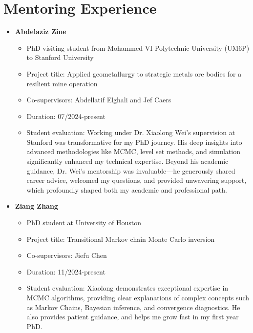 \documentclass[11pt, a4paper]{article}
\begin{document}
\section*{Mentoring Experience}
\begin{itemize}
	\item{\textbf{Abdelaziz Zine}}
	\begin{itemize}
	\item PhD visiting student from Mohammed VI Polytechnic University (UM6P) to Stanford University
	\item Project title: Applied geometallurgy to strategic metals ore bodies for a resilient mine operation
	\item Co-supervisors: Abdellatif Elghali and Jef Caers
	\item Duration: 07/2024-present
	\item Student evaluation: Working under Dr. Xiaolong Wei's supervision at Stanford was transformative for my PhD journey. His deep insights into advanced methodologies like MCMC, level set methods, and simulation significantly enhanced my technical expertise. Beyond his academic guidance, Dr. Wei’s mentorship was invaluable—he generously shared career advice, welcomed my questions, and provided unwavering support, which profoundly shaped both my academic and professional path.
	\end{itemize}
	
	\item{\textbf{Ziang Zhang}}
	\begin{itemize}
	\item PhD student at University of Houston
	\item Project title: Transitional Markov chain Monte Carlo inversion
	\item Co-supervisors: Jiefu Chen
	\item Duration: 11/2024-present
	\item Student evaluation: Xiaolong demonstrates exceptional expertise in MCMC algorithms, providing clear explanations of complex concepts such as Markov Chains, Bayesian inference, and convergence diagnostics. He also provides patient guidance, and helps me grow fast in my first year PhD.
	\end{itemize}

\end{itemize}
\end{document}
